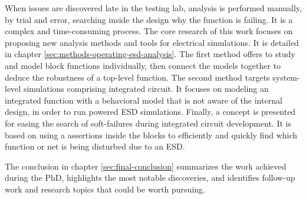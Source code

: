 %
When issues are discovered late in the testing lab, analysis is performed manually, by trial and error, searching inside the design why the function is failing.
It is a complex and time-consuming process.
The core research of this work focuses on proposing new analysis methods and tools for electrical simulations.
It is detailed in chapter \ref{sec:methods-operating-esd-analysis}.
The first method offers to study and model block functions individually, then connect the models together to deduce the robustness of a top-level function.
The second method targets system-level simulations comprising integrated circuit.
It focuses on modeling an integrated function with a behavioral model that is not aware of the internal design, in order to run powered ESD simulations.
Finally, a concept is presented for easing the search of soft-failures during integrated circuit development.
It is based on using a assertions inside the blocks to efficiently and quickly find which function or net is being disturbed due to an ESD.

%
The conclusion in chapter \ref{sec:final-conclusion} summarizes the work achieved during the PhD, highlights the most notable discoveries, and identifies follow-up work and research topics that could be worth pursuing.
